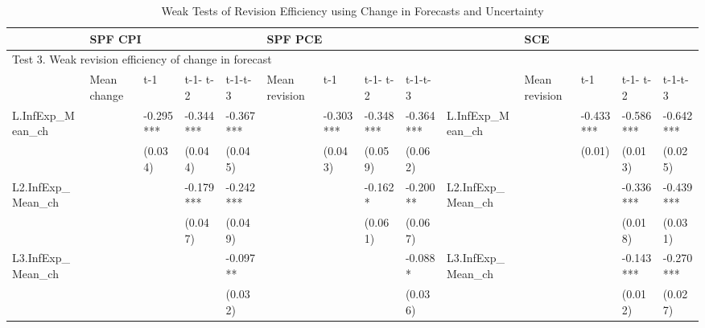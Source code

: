 \documentclass[]{article}
\begin{document}
	
	\begin{table}
		\centering 
		\caption{Weak Tests of Revision Efficiency using Change in Forecasts and Uncertainty}
		\label{WeakRevEfficiency}
		\begin{adjustbox}{width={24cm},totalheight={14cm},angle=90}
			\begin{tabular}{llllllllllllll}
				\hline 
				& \multicolumn{4}{l}{SPF CPI}                     & \multicolumn{4}{l}{SPF PCE}                       &                      & \multicolumn{4}{l}{SCE}                           \\
				\hline 
				\multicolumn{14}{l}{Test 3. Weak revision efficiency of change in forecast}                                                                                                                                    \\
				\hline 
				& Mean change & t-1       & t-1- t-2  & t-1-t-3   & Mean revision & t-1       & t-1- t-2  & t-1-t-3   &                      & Mean revision & t-1       & t-1- t-2  & t-1-t-3   \\
				\hline 
				L.InfExp\_Mean\_ch   &             & -0.295*** & -0.344*** & -0.367*** &               & -0.303*** & -0.348*** & -0.364*** & L.InfExp\_Mean\_ch  &         & -0.433*** & -0.586*** & -0.642*** \\
				&             & (0.034)   & (0.044)   & (0.045)   &               & (0.043)   & (0.059)   & (0.062)   &                    &         & (0.01)     & (0.013)    & (0.025)    \\
				
				L2.InfExp\_Mean\_ch  &             &           & -0.179*** & -0.242*** &               &           & -0.162*   & -0.200**  & L2.InfExp\_Mean\_ch &         &           & -0.336*** & -0.439*** \\
				
				&             &           & (0.047)   & (0.049)   &               &           & (0.061)   & (0.067)   &                                   &         &           & (0.018)    & (0.031)    \\
				L3.InfExp\_Mean\_ch  &             &           &           & -0.097**  &               &           &           & -0.088*   & L3.InfExp\_Mean\_ch &         &           & -0.143*** & -0.270*** \\
				
				&             &           &           & (0.032)   &               &           &           & (0.036)   &                                &         &           & (0.012)    & (0.027)    \\
				

\end{tabular}
\end{adjustbox}
\end{table}
\end{document}
